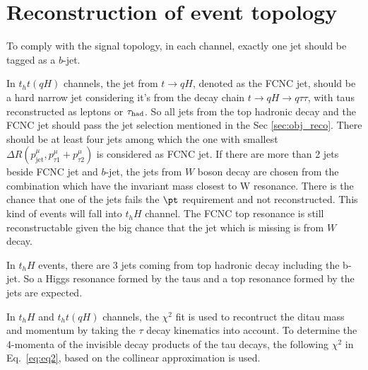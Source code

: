 \section{Reconstruction of event topology}
\label{sec:reconstruction}

To comply with the signal topology, in each channel, exactly one jet should be tagged as a $b$-jet. 

In $t_ht(qH)$ channels, the jet from $t\to qH$, denoted as the FCNC jet, should be a hard narrow jet considering it's from the decay chain $t\to qH\to q\tau\tau$, with taus reconstructed as leptons or $\tau_\text{had}$. So all jets from the top hadronic decay and the FCNC jet should pass the jet selection mentioned in the Sec \ref{sec:obj_reco}. There should be at least four jets among which the one with smallest $\Delta R(p^{\mu}_{\text{jet}},p^{\mu}_{\tau1}+p^{\mu}_{\tau2})$ is considered as FCNC jet. If there are more than 2 jets beside FCNC jet and $b$-jet, the jets from $W$ boson decay are chosen from the combination which have the invariant mass closest to W resonance. There is the chance that one of the jets fails the $\pt$ requirement and not reconstructed. This kind of events will fall into $t_hH$ channel. The FCNC top resonance is still reconstructable given the big chance that the jet which is missing is from $W$ decay.

In $t_hH$ events, there are 3 jets coming from top hadronic decay including the b-jet. So a Higgs resonance formed by the taus and a top resonance formed by the jets are expected.

In $t_hH$ and $t_ht(qH)$ channels, the $\chi^2$ fit
is used to recontruct the ditau mass and momentum by taking the $\tau$ decay kinematics into account. To determine the 4-momenta of the invisible decay products of the tau decays, the following $\chi^2$ in Eq.~\ref{eq:eq2}, based on the collinear approximation is used.

